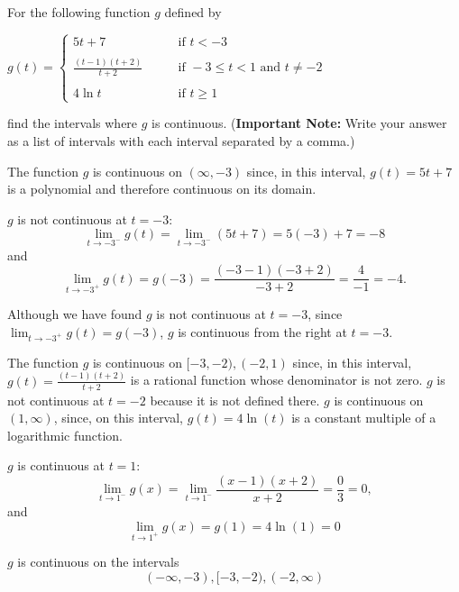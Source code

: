 \documentclass[nooutcomes]{ximera}
\begin{document}
\begin{problem}
For the following function $g$ defined by
	
	$g(t) =   \left\{ \begin{array}{cl}
	5t + 7		 	&	\qquad \text{if } t < -3					\\ \\
	\frac{(t-1)(t+2)}{t+2}	&	\qquad \text{if } -3 \leq t < 1 \text{ and } t \neq -2	\\ \\
	4 \ln t				&	\qquad \text{if } t \geq 1					\end{array} \right.  $

  find the intervals where $g$ is continuous.  (\textbf{Important Note:} Write your answer as a list of intervals with each interval separated by a comma.)	

	\begin{freeResponse}
	The function $g$ is continuous on $(\infty, -3)$ since, in this interval, $g(t)=5t+7$ is a polynomial and therefore continuous on its domain.
  
  $g$ is not continuous at $t = -3$:
  \[
    \lim_{t \to -3^-} g(t) = \lim_{t \to -3^-} (5t+7) = 5(-3) + 7 = -8
  \]
  and
  \[
   \lim_{t \to -3^+} g(t)=g(-3) = \frac{(-3-1)(-3+2)}{-3+2} = \frac{4}{-1} = -4.
  \]

Although we have found $g$ is not continuous at $t = -3$, since $\lim_{t \to -3^+} g(t)=g(-3)$, $g$ is continuous from the right at $t=-3$.


  The function $g$ is continuous on $[-3, -2),(-2,1)$ since, in this interval, $g(t) = \frac{(t-1)(t+2)}{t+2}$ is a rational function whose denominator is not zero. $g$ is not continuous at $t=-2$ because it is not defined there.   $g$ is continuous on $(1, \infty)$, since, on this interval, $g(t) =  4 \ln(t)$ is a constant multiple of a  logarithmic function.

$g$ is continuous at $t = 1$:
  \[
    \lim_{t \to 1^-} g(x) = \lim_{t \to 1^-} \frac{(x-1)(x+2)}{x+2} = \frac{0}{3} = 0,
  \]
  and
\[ \lim_{t \to 1^+} g(x)=g(1) = 4 \ln(1) = 0\]


$g$ is continuous on the intervals \[(-\infty, -3), [-3, -2), (-2, \infty)\]
  \end{freeResponse}
	
		
	
\end{problem}
	
	
			
\end{document}
